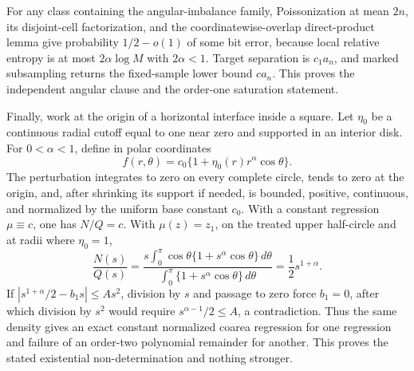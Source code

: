 For any class containing the angular-imbalance family, Poissonization at mean \(2n\), its disjoint-cell factorization, and the coordinatewise-overlap direct-product lemma give probability \(1/2-o(1)\) of some bit error, because local relative entropy is at most \(2\alpha\log M\) with \(2\alpha<1\).  Target separation is \(c_1a_n\), and marked subsampling returns the fixed-sample lower bound \(ca_n\).  This proves the independent angular clause and the order-one saturation statement.

Finally, work at the origin of a horizontal interface inside a square.  Let \(\eta_0\) be a continuous radial cutoff equal to one near zero and supported in an interior disk.  For \(0<\alpha<1\), define in polar coordinates
\[
 f(r,\theta)=c_0\{1+\eta_0(r)r^\alpha\cos\theta\}.
\]
The perturbation integrates to zero on every complete circle, tends to zero at the origin, and, after shrinking its support if needed, is bounded, positive, continuous, and normalized by the uniform base constant \(c_0\).  With a constant regression \(\mu\equiv c\), one has \(N/Q=c\).  With \(\mu(z)=z_1\), on the treated upper half-circle and at radii where \(\eta_0=1\),
\[
 \frac{N(s)}{Q(s)}
 =\frac{s\int_0^\pi\cos\theta\{1+s^\alpha\cos\theta\}\,d\theta}
 {\int_0^\pi\{1+s^\alpha\cos\theta\}\,d\theta}
 =\frac12s^{1+\alpha}.
\]
If \(|s^{1+\alpha}/2-b_1s|\leq As^2\), division by \(s\) and passage to zero force \(b_1=0\), after which division by \(s^2\) would require \(s^{\alpha-1}/2\leq A\), a contradiction.  Thus the same density gives an exact constant normalized coarea regression for one regression and failure of an order-two polynomial remainder for another.  This proves the stated existential non-determination and nothing stronger.
